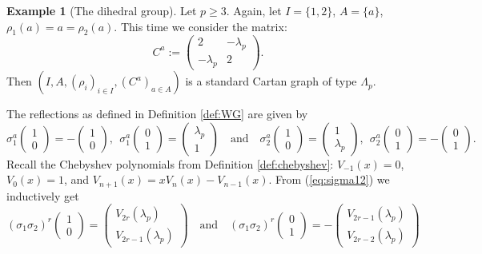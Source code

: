 \documentclass[11pt,a4paper]{amsart}
\theoremstyle{definition}
\newtheorem{Example}[Lemma]{Example}
\numberwithin{equation}{section}
\newcommand{\rfl }{\rho }
\newcommand{\Cm }{C}
\begin{document}
\begin{Example}[The dihedral group]\label{dihedralgroup}
Let $p\ge 3$. 
Again, let $I=\{1,2\}$, $A=\{a\}$, $\rfl_1(a)=a=\rfl_2(a)$. This time we consider the matrix:
$$ C^a :=
\begin{pmatrix} 2 & -\lambda_p \\ -\lambda_p & 2 \end{pmatrix}
. $$
Then $(I,A,(\rfl _i)_{i\in I},(\Cm ^a)_{a\in A})$ is a standard Cartan graph of type $\Lambda_p$. 

The reflections as defined in Definition \ref{def:WG}
are given by 
\begin{equation} \label{eq:sigma12}
\sigma_1^a\begin{pmatrix} 1\\0 \end{pmatrix}
= -\begin{pmatrix} 1\\0 \end{pmatrix},~~
\sigma_1^a\begin{pmatrix} 0\\1 \end{pmatrix}
= \begin{pmatrix} \lambda_p\\1 \end{pmatrix}
\mbox{~~~and~~~}
\sigma_2^a\begin{pmatrix} 1\\0 \end{pmatrix}
= \begin{pmatrix} 1\\ \lambda_p \end{pmatrix},~~
\sigma_2^a\begin{pmatrix} 0\\1 \end{pmatrix}
= -\begin{pmatrix} 0\\1 \end{pmatrix}.
\end{equation}
Recall the Chebyshev polynomials from 
Definition \ref{def:chebyshev}: 
$V_{-1}(x)=0$, $V_{0}(x)=1$,
and $V_{n+1}(x)=xV_n(x)-V_{n-1}(x)$. 
From (\ref{eq:sigma12}) we inductively get
\begin{equation} \label{eq:sigma12r}
(\sigma_1\sigma_2)^r \begin{pmatrix} 1\\0 
\end{pmatrix} = \begin{pmatrix} V_{2r}(\lambda_p)
\\ V_{2r-1}(\lambda_p) \end{pmatrix}
\mbox{~~~and~~~}
(\sigma_1\sigma_2)^r \begin{pmatrix} 0\\1 
\end{pmatrix} = - \begin{pmatrix} V_{2r-1}(\lambda_p)
\\ V_{2r-2}(\lambda_p) \end{pmatrix}
\end{equation}


\end{Example}
\end{document}
